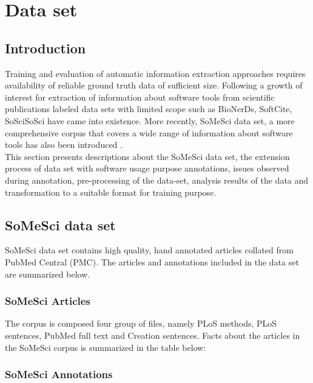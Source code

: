 \chapter{Data set}
\label{ch:dataset}
 
%
%
\section{Introduction}
\label{sec:dataset:intro}

Training and evaluation of automatic information extraction approaches requires availability of reliable ground truth data of sufficient size. Following a growth of interest for extraction of information about software tools from scientific publications labeled data sets with limited scope such as BioNerDs, SoftCite, SoSciSoSci have came into existence. More recently, SoMeSci data set, a more comprehensive corpus that covers a wide range of information about software tools has also been introduced \citep{schindler2021somesci}. \\
 
This section presents descriptions about the SoMeSci data set, the extension process of data set with software usage purpose annotations, issues observed during annotation, pre-processing of the data-set, analysis results of the data and transformation to a suitable format for training purpose.  


\section{SoMeSci data set}
\label{sec:dataset:SoMeSci}

SoMeSci data set contains high quality, hand annotated articles collated from PubMed Central (PMC). The articles and annotations included in the data set are summarized below.  

\subsection{ SoMeSci Articles }
\label{subsec:dataset:SoMeSci:Articles}

The corpus is composed four group of files, namely PLoS methods, PLoS sentences, PubMed full text and Creation sentences. Facts about the articles in the SoMeSci corpus is summarized in the table below:

\subsection{SoMeSci Annotations  }
\label{subsec:dataset:SoMeSci:Annotations }

